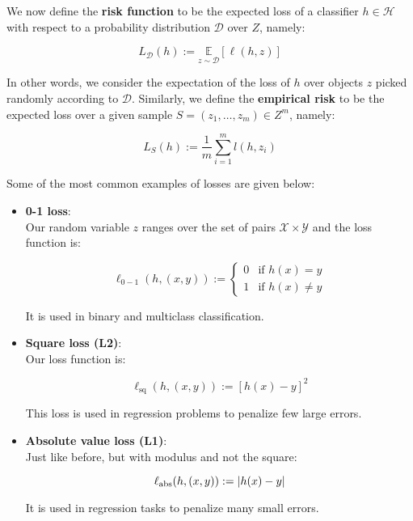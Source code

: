 \documentclass[../../main/main.tex]{subfiles}
\begin{document}
We now define the \textbf{risk function} to be the expected loss of a classifier \( h \in \mathcal{H} \) with respect to a probability distribution \( \mathcal{D} \) over \( Z \), namely:

\begin{equation}
    L_{\mathcal{D}}(h) := \underset{z \sim \mathcal{D}}{\mathbb{E}} [\ell (h,z)]
    \label{eq:C2_RF}
\end{equation}

In other words, we consider the expectation of the loss of \( h \) over objects \( z \) picked randomly according to \( \mathcal{D} \). Similarly, we define the \textbf{empirical risk} to be the expected loss over a given sample \( S = (z_1, \dots, z_m) \in Z^m \), namely:

\begin{equation}
    L_S (h) := \frac{1}{m} \sum_{i=1}^{m} l(h,z_i)
    \label{eq:C2_ERG}
\end{equation}

Some of the most common examples of losses are given below:
\begin{itemize}
    \item \textbf{0-1 loss}:\\
        Our random variable \( z \) ranges over the set of pairs \( \mathcal{X} \times \mathcal{Y} \) and the loss function is:

        \begin{equation}
            \ell_{0-1}(h,(x,y)) :=
            \begin{cases}
                0   &   \text{if } h(x) = y \\
                1   &   \text{if } h(x) \neq y
            \end{cases}
            \label{eq:C2_01L}
        \end{equation}

        It is used in binary and multiclass classification.

    \item \textbf{Square loss (L2)}:\\
        Our loss function is:

        \begin{equation}
            \ell_\mathrm{sq}(h,(x,y)) := [h(x) - y]^2
            \label{eq:C2_SL}
        \end{equation}

        This loss is used in regression problems to penalize few large errors.

    \item \textbf{Absolute value loss (L1)}:\\
        Just like before, but with modulus and not the square:

        \begin{equation}
            \ell_\mathrm{abs}(h,(x,y)) := \abs{h(x) - y}
            \label{eq:C2_AVL}
        \end{equation}

        It is used in regression tasks to penalize many small errors.
\end{itemize}
\end{document}
